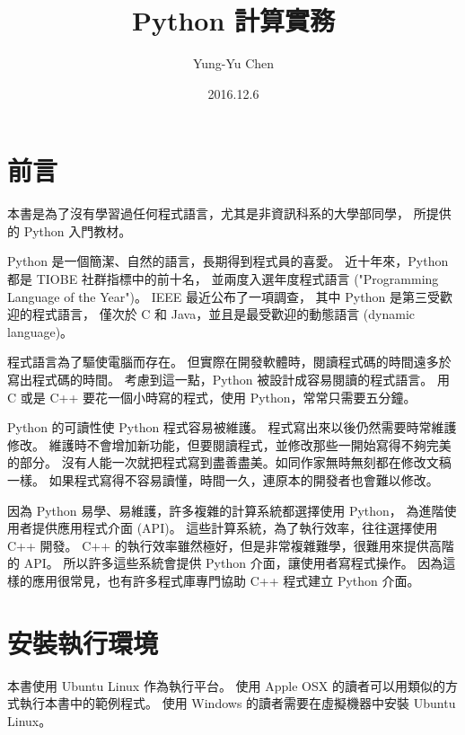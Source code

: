 \documentclass[a4paper,12pt]{book}
\theoremstyle{definition}
\begin{document}
\title{Python 計算實務}
\author{Yung-Yu Chen}
\date{2016.12.6}

\maketitle

\tableofcontents

\hspace{.5cm}

\frontmatter

\chapter*{前言}

本書是為了沒有學習過任何程式語言，尤其是非資訊科系的大學部同學，
所提供的 Python 入門教材。

Python 是一個簡潔、自然的語言，長期得到程式員的喜愛。
近十年來，Python 都是 TIOBE 社群指標\cite{tiobe_index}中的前十名，
並兩度入選年度程式語言 ("Programming Language of the Year")。
IEEE 最近公布了一項調查\cite{ieee_pl_2016}，
其中 Python 是第三受歡迎的程式語言，
僅次於 C 和 Java，並且是最受歡迎的動態語言 (dynamic language)。

程式語言為了驅使電腦而存在。
但實際在開發軟體時，閱讀程式碼的時間遠多於寫出程式碼的時間。
考慮到這一點，Python 被設計成容易閱讀的程式語言。
用 C 或是 C++ 要花一個小時寫的程式，使用 Python，常常只需要五分鐘。

Python 的可讀性使 Python 程式容易被維護。
程式寫出來以後仍然需要時常維護修改。
維護時不會增加新功能，但要閱讀程式，並修改那些一開始寫得不夠完美的部分。
沒有人能一次就把程式寫到盡善盡美。如同作家無時無刻都在修改文稿一樣。
如果程式寫得不容易讀懂，時間一久，連原本的開發者也會難以修改。

因為 Python 易學、易維護，許多複雜的計算系統都選擇使用 Python，
為進階使用者提供應用程式介面 (API)。
這些計算系統，為了執行效率，往往選擇使用 C++ 開發。
C++ 的執行效率雖然極好，但是非常複雜難學，很難用來提供高階的 API。
所以許多這些系統會提供 Python 介面，讓使用者寫程式操作。
因為這樣的應用很常見，也有許多程式庫專門協助 C++ 程式建立 Python 介面。

\mainmatter

\chapter{安裝執行環境}

本書使用 Ubuntu Linux 作為執行平台。
使用 Apple OSX 的讀者可以用類似的方式執行本書中的範例程式。
使用 Windows 的讀者需要在虛擬機器中安裝 Ubuntu Linux。
\end{document}
